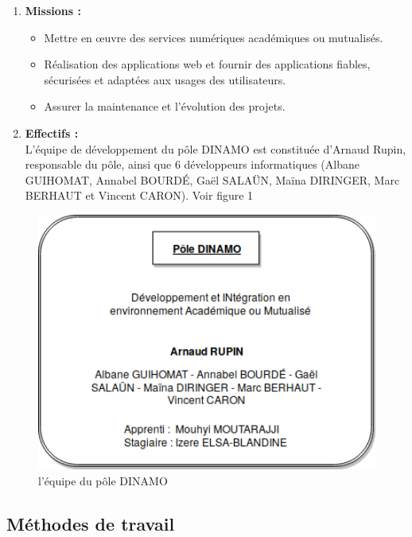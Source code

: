 \documentclass[12pt]{article}
\begin{document}
\begin{enumerate}
\item \textbf{Missions :}\\

\begin{itemize}
\item  Mettre en œuvre des services numériques académiques ou mutualisés.
\item  Réalisation des applications web et fournir des applications fiables, sécurisées et adaptées aux usages des utilisateurs. 
\item  Assurer la maintenance et l'évolution des projets.\\
\end{itemize}

\item \textbf{Effectifs :}\\
L’équipe de développement du pôle DINAMO est constituée d’Arnaud Rupin, responsable du pôle, ainsi que 6 développeurs informatiques (Albane GUIHOMAT, Annabel BOURDÉ, Gaël SALAÜN, Maïna DIRINGER, Marc BERHAUT et Vincent CARON). Voir figure 1\\

\end{enumerate}

\begin{figure}[H]
	\centering
 		\includegraphics[width=1\textwidth]{diagrammes/PoleDinamo.png}
  		\caption{l'équipe du pôle DINAMO}
	\end{figure}


\subsection{Méthodes de travail}
\end{document}
